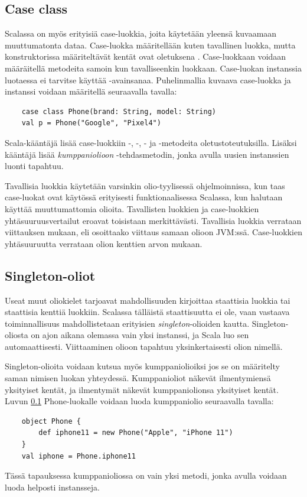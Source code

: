\subsection{Case class} \label{caseclass}
Scalassa on myös erityisiä case-luokkia, joita käytetään yleensä kuvaamaan muuttumatonta dataa. Case-luokka määritellään kuten tavallinen luokka, mutta konstruktorissa määriteltävät kentät ovat oletuksena . Case-luokkaan voidaan määräitellä metodeita samoin kun tavalliseenkin luokkaan. Case-luokan instanssia luotaessa ei tarvitse käyttää -avainsanaa. Puhelinmallia kuvaava case-luokka ja instanssi voidaan määritellä seuraavalla tavalla:
\begin{lstlisting}
    case class Phone(brand: String, model: String)
    val p = Phone("Google", "Pixel4")
\end{lstlisting}
Scala-kääntäjä lisää case-luokkiin -, -, - ja -metodeita oletustoteutuksilla. Lisäksi kääntäjä lisää \textit{kumppaniolioon} -tehdasmetodin, jonka avulla uusien instanssien luonti tapahtuu.
\cite[Luku 15]{prorgrammingInScala3rd}

Tavallisia luokkia käytetään varsinkin olio-tyylisessä ohjelmoinnissa, kun taas case-luokat ovat käytössä erityisesti funktionaalisessa Scalassa, kun halutaan käyttää muuttumattomia olioita. Tavallisten luokkien ja case-luokkien yhtäsuuruusvertailut eroavat toisistaan merkittävästi. Tavallisia luokkia verrataan viittauksen mukaan, eli osoittaako viittaus samaan olioon JVM:ssä. Case-luokkien yhtäsuuruutta verrataan olion kenttien arvon mukaan.
\cite[Luku 15]{prorgrammingInScala3rd}

\subsection{Singleton-oliot} \label{singleton-oliot}
Useat muut oliokielet tarjoavat mahdollisuuden kirjoittaa staattisia luokkia tai staattisia kenttiä luokkiin. Scalassa tälläistä staattisuutta ei ole, vaan vastaava toiminnallisuus mahdollistetaan erityisien \textit{singleton}-olioiden kautta. Singleton-oliosta on ajon aikana olemassa vain yksi instanssi, ja Scala luo sen automaattisesti. Viittaaminen olioon tapahtuu yksinkertaisesti olion nimellä.
\cite[Singleton objects]{tourOfScala}

Singleton-olioita voidaan kutsua myös kumppaniolioiksi jos se on määritelty saman nimisen luokan yhteydessä. Kumppanioliot näkevät ilmentymiensä yksityiset kentät, ja ilmentymät näkevät kumppaniolionsa yksityiset kentät. Luvun \ref{caseclass} Phone-luokalle voidaan luoda kumppaniolio seuraavalla tavalla:
\begin{lstlisting}
    object Phone {
        def iphone11 = new Phone("Apple", "iPhone 11")
    }
    val iphone = Phone.iphone11
\end{lstlisting}
Tässä tapauksessa kumppanioliossa on vain yksi metodi, jonka avulla voidaan luoda helposti instansseja.
\cite[Luku 4]{prorgrammingInScala3rd}


